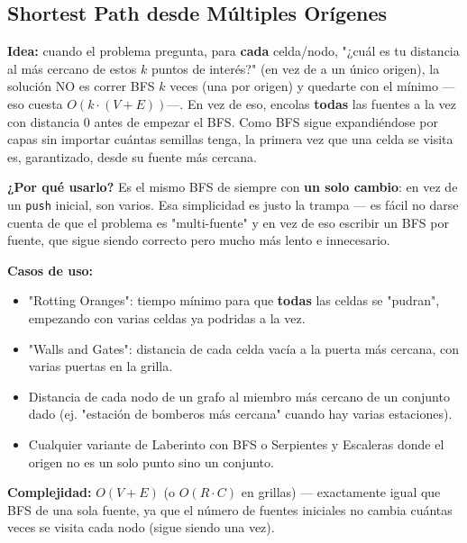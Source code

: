 \documentclass[10pt,a4paper,twocolumn]{article}
\begin{document}
\subsection{Shortest Path desde Múltiples Orígenes}

\textbf{Idea:} cuando el problema pregunta, para \textbf{cada}
celda/nodo, "¿cuál es tu distancia al más cercano de estos $k$
puntos de interés?" (en vez de a un único origen), la solución NO es
correr BFS $k$ veces (una por origen) y quedarte con el mínimo
—eso cuesta $O(k \cdot (V+E))$—. En vez de eso, encolas
\textbf{todas} las fuentes a la vez con distancia 0 antes de empezar
el BFS. Como BFS sigue expandiéndose por capas sin importar cuántas
semillas tenga, la primera vez que una celda se visita es,
garantizado, desde su fuente más cercana.

\textbf{¿Por qué usarlo?} Es el mismo BFS de siempre con \textbf{un
	solo cambio}: en vez de un \texttt{push} inicial, son varios. Esa
simplicidad es justo la trampa — es fácil no darse cuenta de que el
problema es "multi-fuente" y en vez de eso escribir un BFS por
fuente, que sigue siendo correcto pero mucho más lento e innecesario.

\textbf{Casos de uso:}

\begin{itemize}
	\item "Rotting Oranges": tiempo mínimo para que \textbf{todas}
	las celdas se "pudran", empezando con varias celdas ya podridas
	a la vez.
	\item "Walls and Gates": distancia de cada celda vacía a la
	puerta más cercana, con varias puertas en la grilla.
	\item Distancia de cada nodo de un grafo al miembro más cercano
	de un conjunto dado (ej. "estación de bomberos más cercana"
	cuando hay varias estaciones).
	\item Cualquier variante de Laberinto con BFS o Serpientes y
	Escaleras donde el origen no es un solo punto sino un conjunto.
\end{itemize}

\textbf{Complejidad:} $O(V + E)$ (o $O(R \cdot C)$ en grillas) —
exactamente igual que BFS de una sola fuente, ya que el número de
fuentes iniciales no cambia cuántas veces se visita cada nodo (sigue
siendo una vez).
\end{document}
